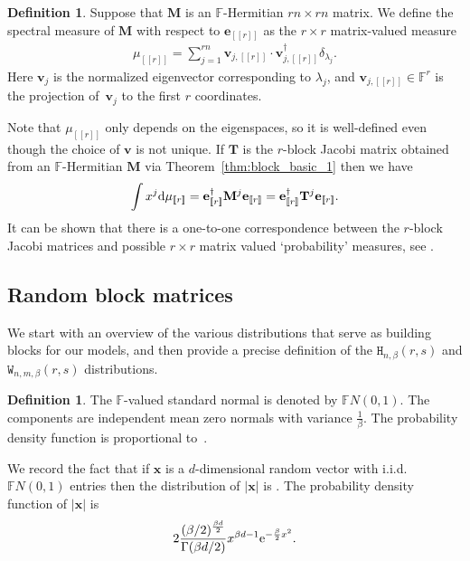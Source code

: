 \documentclass[pdftex]{sigma}
\numberwithin{equation}{section}
\theoremstyle{definition}
\newtheorem{Definition}[Theorem]{Definition}
\newcommand{\FF}{{\mathbb{F}}}
\newcommand{\T}{\dag}
\newcommand{\lst}[1]{[\![#1 ]\!]}
\newcommand{\mbf}[1]{\mathbf{#1}}
\newcommand{\HH}{\mathtt{H}_{n,\beta}}
\newcommand{\WW}{\mathtt{W}_{n,m, \beta}}
\begin{document}
\begin{Definition}
 Suppose that $\mbf{M}$ is an $\FF$-Hermitian $rn\times rn$ matrix.
 We define the spectral measure of $\mbf{M}$ with respect to $\mbf{e}_{\lst{r}}$ as the $r\times r$ matrix-valued measure
\begin{align*}
 \mu_{\lst{r}}=\sum_{j=1}^{rn} \mbf{v}_{j,\lst{r}} \cdot \mbf{v}_{j,\lst{r}}^{\T} \delta_{\lambda_j}.
\end{align*}
Here $\mbf{v}_{j}$ is the normalized eigenvector corresponding to $\lambda_j$, and
$\mbf{v}_{j,\lst{r}}\in \FF^r$ is the projection of~$\mbf{v}_j$ to the first $r$ coordinates.
\end{Definition}
Note that $\mu_{\lst{r}}$ only depends on the eigenspaces, so it is well-defined even though the choice of $\mbf{v}$ is not unique. If $\mbf{T}$ is the $r$-block Jacobi matrix obtained from an $\FF$-Hermitian $\mbf{M}$ via Theorem~\ref{thm:block_basic_1} then we have
\begin{align*}
\int x^j {\rm d}\mu_{\lst{r}}=\mbf{e}_{\lst{r}}^{\T} \mbf{M}^j \mbf{e}_{\lst{r}}= \mbf{e}_{\lst{r}}^{\T} \mbf{T}^j \mbf{e}_{\lst{r}}.
\end{align*}
It can be shown that there is a one-to-one correspondence between the $r$-block Jacobi matrices and possible $r\times r$ matrix valued `probability' measures, see \cite[Section 2]{MOPUC}.




\subsection{Random block matrices}\label{subs:matrix_distr}

We start with an overview of the various distributions that serve as building blocks for our models, and then provide a precise definition of the $\HH(r,s)$ and $\WW(r,s)$ distributions.





\begin{Definition}
 The $\FF$-valued standard normal is denoted by $\FF N(0,1)$. The components are independent mean zero normals with variance $\frac{1}{\beta}$. The probability density function is proportional to~.
\end{Definition}

We record the fact that if $\mbf{x}$ is a $d$-dimensional random vector with i.i.d.~$\FF N(0,1)$ entries then the distribution of $|\mbf{x}|$ is . The probability density function of $|\mbf{x}|$ is
 \[
2 \frac{ (\beta/2)^{\frac{\beta d}{2}}}{\Gamma(\beta d/2)} x^{\beta d-1} {\rm e}^{-\frac{\beta}{2} x^2}.
 \]
\end{document}
